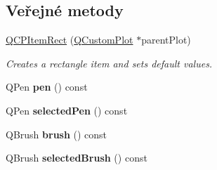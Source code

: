 \subsection*{Veřejné metody}
\begin{DoxyCompactItemize}
\item 
\hyperlink{classQCPItemRect_a412ad1579f7a1fba453d0fa28c496cbc}{Q\+C\+P\+Item\+Rect} (\hyperlink{classQCustomPlot}{Q\+Custom\+Plot} $\ast$parent\+Plot)
\begin{DoxyCompactList}\small\item\em Creates a rectangle item and sets default values. \end{DoxyCompactList}\item 
\hypertarget{classQCPItemRect_a3cb7b6de5e82cc5a3c99e9de919a55e6}{}Q\+Pen {\bfseries pen} () const \label{classQCPItemRect_a3cb7b6de5e82cc5a3c99e9de919a55e6}

\item 
\hypertarget{classQCPItemRect_a7e701c34e72a4c25647e93fa369f395c}{}Q\+Pen {\bfseries selected\+Pen} () const \label{classQCPItemRect_a7e701c34e72a4c25647e93fa369f395c}

\item 
\hypertarget{classQCPItemRect_a03d2d26ffcac78b25b8e90915f9c4abe}{}Q\+Brush {\bfseries brush} () const \label{classQCPItemRect_a03d2d26ffcac78b25b8e90915f9c4abe}

\item 
\hypertarget{classQCPItemRect_a3b586228393f5c8efa78c4d2a4b25cbf}{}Q\+Brush {\bfseries selected\+Brush} () const \label{classQCPItemRect_a3b586228393f5c8efa78c4d2a4b25cbf}


\end{DoxyCompactItemize}
